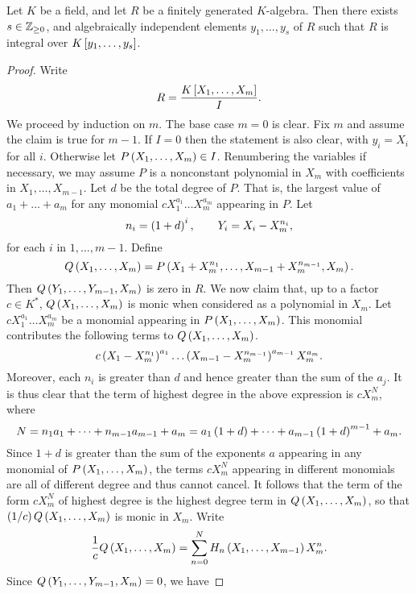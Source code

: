 \begin{proposition}
Let $ K $ be a field, and let $ R $ be a finitely generated $ K $-algebra. Then there exists $ s \in \Z_{\ge 0} $, and algebraically independent elements $ y_1, \dots, y_s $ of $ R $ such that $ R $ is integral over $ K\sb{y_1, \dots, y_s} $.
\end{proposition}

\begin{proof}
Write
$$ R = \dfrac{K\sb{X_1, \dots, X_m}}{I}. $$
We proceed by induction on $ m $. The base case $ m = 0 $ is clear. Fix $ m $ and assume the claim is true for $ m - 1 $. If $ I = 0 $ then the statement is also clear, with $ y_i = X_i $ for all $ i $. Otherwise let $ P\rb{X_1, \dots, X_m} \in I $. Renumbering the variables if necessary, we may assume $ P $ is a nonconstant polynomial in $ X_m $ with coefficients in $ X_1, \dots, X_{m - 1} $. Let $ d $ be the total degree of $ P $. That is, the largest value of $ a_1 + \dots + a_m $ for any monomial $ cX_1^{a_1} \dots X_m^{a_m} $ appearing in $ P $. Let
$$ n_i = \rb{1 + d}^i, \qquad Y_i = X_i - X_m^{n_i}, $$
for each $ i $ in $ 1, \dots, m - 1 $. Define
$$ Q\rb{X_1, \dots, X_m} = P\rb{X_1 + X_m^{n_1}, \dots, X_{m - 1} + X_m^{n_{m - 1}}, X_m}. $$
Then $ Q\rb{Y_1, \dots, Y_{m - 1}, X_m} $ is zero in $ R $. We now claim that, up to a factor $ c \in K^* $, $ Q\rb{X_1, \dots, X_m} $ is monic when considered as a polynomial in $ X_m $. Let $ cX_1^{a_1} \dots X_m^{a_m} $ be a monomial appearing in $ P\rb{X_1, \dots, X_m} $. This monomial contributes the following terms to $ Q\rb{X_1, \dots, X_m} $.
$$ c\rb{X_1 - X_m^{n_1}}^{a_1} \dots \rb{X_{m - 1} - X_m^{n_{m - 1}}}^{a_{m - 1}}X_m^{a_m}. $$
Moreover, each $ n_i $ is greater than $ d $ and hence greater than the sum of the $ a_j $. It is thus clear that the term of highest degree in the above expression is $ cX_m^N $, where
$$ N = n_1a_1 + \dots + n_{m - 1}a_{m - 1} + a_m = a_1\rb{1 + d} + \dots + a_{m - 1}\rb{1 + d}^{m - 1} + a_m. $$
Since $ 1 + d $ is greater than the sum of the exponents $ a $ appearing in any monomial of $ P\rb{X_1, \dots, X_m} $, the terms $ cX_m^N $ appearing in different monomials are all of different degree and thus cannot cancel. It follows that the term of the form $ cX_m^N $ of highest degree is the highest degree term in $ Q\rb{X_1, \dots, X_m} $, so that $ \rb{1 / c}Q\rb{X_1, \dots, X_m} $ is monic in $ X_m $. Write
$$ \dfrac{1}{c}Q\rb{X_1, \dots, X_m} = \sum_{n = 0}^N H_n\rb{X_1, \dots, X_{m - 1}}X_m^n. $$
Since $ Q\rb{Y_1, \dots, Y_{m - 1}, X_m} = 0 $, we have

\end{proof}
